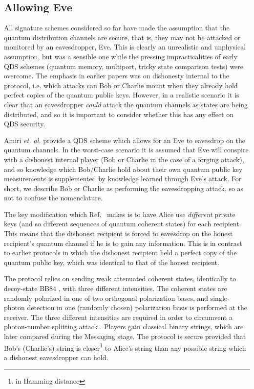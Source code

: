 \subsection*{Allowing Eve}
All signature schemes considered so far have made the assumption that the quantum distribution channels are secure, that is, they may not be attacked or monitored by an eavesdropper, Eve. This is clearly an unrealistic and unphysical assumption, but was a sensible one while the pressing impracticalities of early QDS schemes (quantum memory, multiport, tricky state comparison tests) were overcome. The emphasis in earlier papers was on dishonesty internal to the protocol, i.e. which attacks can Bob or Charlie mount when they already hold perfect copies of the quantum public keys. However, in a realistic scenario it is clear that an eavesdropper \emph{could} attack the quantum channels as states are being distributed, and so it is important to consider whether this has any effect on QDS security.

Amiri \emph{et. al.} provide a QDS scheme which allows for an Eve to eavesdrop on the quantum channels. In the worst-case scenario it is assumed that Eve will conspire with a dishonest internal player (Bob or Charlie in the case of a forging attack), and so knowledge which Bob/Charlie hold about their own quantum public key measurements is supplemented by knowledge learned through Eve's attack. For short, we describe Bob or Charlie as performing the eavesdropping attack, so as not to confuse the nomenclature. 

The key modification which Ref.~\cite{Amiri2016} makes is to have Alice use \emph{different} private keys (and so different sequences of quantum coherent states) for each recipient. This means that the dishonest recipient is forced to eavesdrop on the honest recipient's quantum channel if he is to gain any information. This is in contrast to earlier protocols in which the dishonest recipient held a perfect copy of the quantum public key, which was identical to that of the honest recipient. 



The protocol relies on sending weak attenuated coherent states, identically to decoy-state BB$84$ , with three different intensities. The coherent states are randomly polarized in one of two orthogonal polarization bases, and single-photon detection in one (randomly chosen) polarization basis is performed at the receiver. The three different intensities are required in order to circumvent a photon-number splitting attack . Players gain classical binary strings, which are later compared during the Messaging stage. The protocol is secure provided that Bob's (Charlie's) string is closer\footnote{in Hamming distance} to Alice's string than any possible string which a dishonest eavesdropper can hold. 

